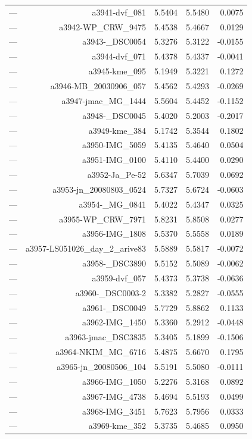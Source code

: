 \begin{table}[htbp]
\begin{tabular}{lrrrr}
— & a3941-dvf_081 & 5.5404 & 5.5480 & 0.0075 \\
— & a3942-WP_CRW_9475 & 5.4538 & 5.4667 & 0.0129 \\
— & a3943-_DSC0054 & 5.3276 & 5.3122 & -0.0155 \\
— & a3944-dvf_071 & 5.4378 & 5.4337 & -0.0041 \\
— & a3945-kme_095 & 5.1949 & 5.3221 & 0.1272 \\
— & a3946-MB_20030906_057 & 5.4562 & 5.4293 & -0.0269 \\
— & a3947-jmac_MG_1444 & 5.5604 & 5.4452 & -0.1152 \\
— & a3948-_DSC0045 & 5.4020 & 5.2003 & -0.2017 \\
— & a3949-kme_384 & 5.1742 & 5.3544 & 0.1802 \\
— & a3950-IMG_5059 & 5.4135 & 5.4640 & 0.0504 \\
— & a3951-IMG_0100 & 5.4110 & 5.4400 & 0.0290 \\
— & a3952-Ja_Pe-52 & 5.6347 & 5.7039 & 0.0692 \\
— & a3953-jn_20080803_0524 & 5.7327 & 5.6724 & -0.0603 \\
— & a3954-_MG_0841 & 5.4022 & 5.4347 & 0.0325 \\
— & a3955-WP_CRW_7971 & 5.8231 & 5.8508 & 0.0277 \\
— & a3956-IMG_1808 & 5.5370 & 5.5558 & 0.0189 \\
— & a3957-LS051026_day_2_arive83 & 5.5889 & 5.5817 & -0.0072 \\
— & a3958-_DSC3890 & 5.5152 & 5.5089 & -0.0062 \\
— & a3959-dvf_057 & 5.4373 & 5.3738 & -0.0636 \\
— & a3960-_DSC0003-2 & 5.3382 & 5.2827 & -0.0555 \\
— & a3961-_DSC0049 & 5.7729 & 5.8862 & 0.1133 \\
— & a3962-IMG_1450 & 5.3360 & 5.2912 & -0.0448 \\
— & a3963-jmac_DSC3835 & 5.3405 & 5.1899 & -0.1506 \\
— & a3964-NKIM_MG_6716 & 5.4875 & 5.6670 & 0.1795 \\
— & a3965-jn_20080506_104 & 5.5191 & 5.5080 & -0.0111 \\
— & a3966-IMG_1050 & 5.2276 & 5.3168 & 0.0892 \\
— & a3967-IMG_4738 & 5.4694 & 5.5193 & 0.0499 \\
— & a3968-IMG_3451 & 5.7623 & 5.7956 & 0.0333 \\
— & a3969-kme_352 & 5.3735 & 5.4685 & 0.0950 \\

\end{tabular}
\end{table}
